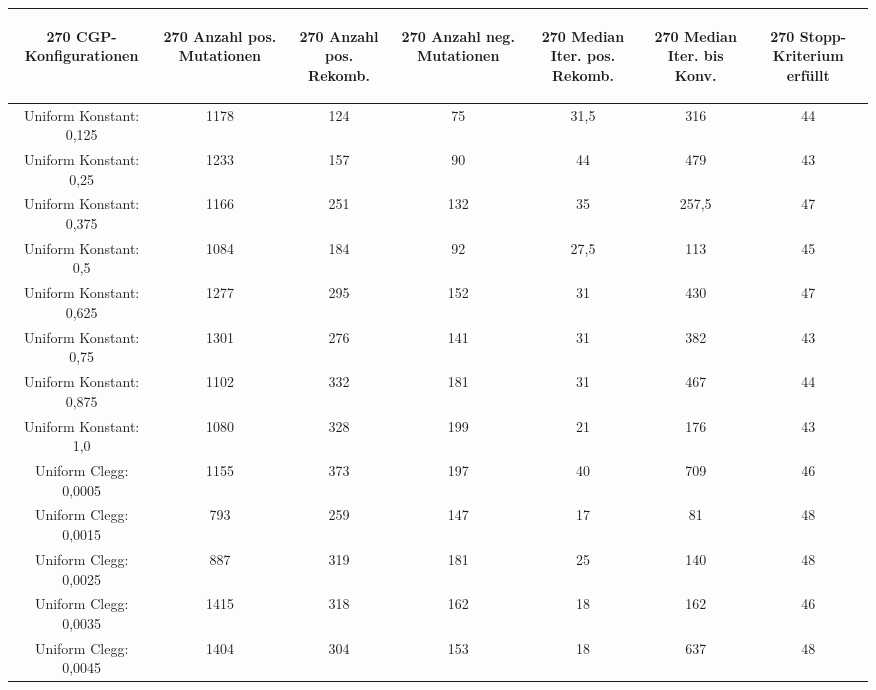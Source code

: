 \begin{table}[H]
	\centering
	\begin{tabular}{c | c | c | c | c | c | c}
		\begin{turn}{270} \textbf{CGP-Konfigurationen} \end{turn} & \begin{turn}{270} \textbf{Anzahl pos. Mutationen} \end{turn} & \begin{turn}{270} \textbf{Anzahl pos. Rekomb.} \end{turn} & \begin{turn}{270} \textbf{Anzahl neg. Mutationen} \end{turn} & \begin{turn}{270} \textbf{Median Iter. pos. Rekomb.} \end{turn} & \begin{turn}{270} \textbf{Median Iter. bis Konv.} \end{turn} & \begin{turn}{270} \textbf{Stopp-Kriterium erfüllt} \end{turn}\\
		\hline
		Uniform Konstant: 0,125 & 1178 & 124 & 75 & 31,5 & 316 & 44\\
		\hline
		Uniform Konstant: 0,25 & 1233 & 157 & 90 & 44 & 479 & 43\\
		\hline
		Uniform Konstant: 0,375 & 1166 & 251 & 132 & 35 & 257,5 & 47\\
		\hline
		Uniform Konstant: 0,5 & 1084 & 184 & 92 & 27,5 & 113 & 45\\
		\hline
		Uniform Konstant: 0,625 & 1277 & 295 & 152 & 31 & 430 & 47\\
		\hline
		Uniform Konstant: 0,75 & 1301 & 276 & 141 & 31 & 382 & 43\\
		\hline
		Uniform Konstant: 0,875 & 1102 & 332 & 181 & 31 & 467 & 44\\
		\hline
		Uniform Konstant: 1,0 & 1080 & 328 & 199 & 21 & 176 & 43\\
		\hline
		Uniform Clegg: 0,0005 & 1155 & 373 & 197 & 40 & 709 & 46\\
		\hline
		Uniform Clegg: 0,0015 & 793 & 259 & 147 & 17 & 81 & 48\\
		\hline
		Uniform Clegg: 0,0025 & 887 & 319 & 181 & 25 & 140 & 48\\
		\hline
		Uniform Clegg: 0,0035 & 1415 & 318 & 162 & 18 & 162 & 46\\
		\hline
		Uniform Clegg: 0,0045 & 1404 & 304 & 153 & 18 & 637 & 48\\

\end{tabular}
\end{table}
